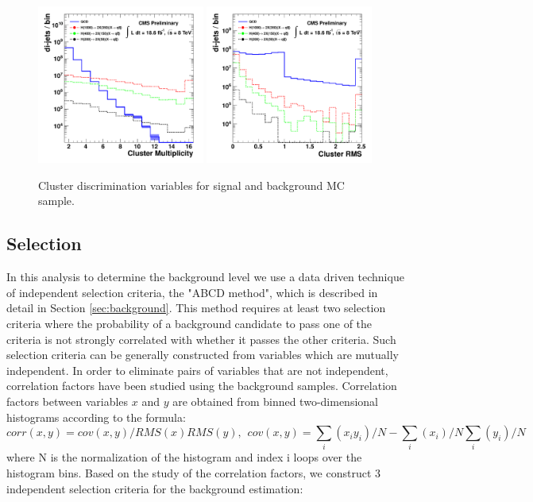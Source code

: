 \begin{enumerate}
\begin{figure}
\centering
\includegraphics[width=0.49\textwidth]{plots/discrimination/disc_clrN.pdf}
\includegraphics[width=0.49\textwidth]{plots/discrimination/disc_clrRMS.pdf}
\caption{Cluster discrimination variables for signal and background MC sample. \label{fig:discclr}}

\end{figure}


\end{enumerate}

\subsection{Selection}
\label{subsec:selection}

In this analysis  
to determine the background level we use a data driven technique
of independent selection criteria, the "ABCD method", which is
 described in detail in Section \ref{sec:background}. This method requires
at least two selection criteria where the probability of a background candidate to pass one of the criteria is
not strongly correlated with whether it passes the other criteria. Such selection criteria can be generally
constructed
from variables which are mutually independent. 
 In order to eliminate pairs of variables that are not independent,
 correlation factors have been studied using the background samples.  
Correlation factors between variables $x$ and $y$ are obtained from binned two-dimensional histograms 
according to the formula:
\begin{equation}
 corr(x,y) = cov(x,y)/RMS(x)RMS(y), \hspace{5pt} cov(x,y)= \sum_i(x_i y_i)/N - \sum_i(x_i)/N \sum_i(y_i)/N
\label{eqn:corr}
\end{equation}
where N is the normalization of the histogram and index i loops over the histogram bins. Based on the study of the correlation factors, we construct
3 independent selection criteria for the background estimation:

